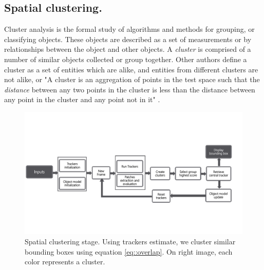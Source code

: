 
\subsection{Spatial clustering.}

Cluster analysis is the formal study of algorithms and methods for grouping, or
classifying objects. These objects are described as a set of measurements or by
relationships between the object and other objects. A \textit{cluster} is
comprised of a number of similar objects collected or group together. Other
authors define a cluster as a set of entities which are alike, and entities from
different clusters are not alike, or "A cluster is an aggregation of points in
the test space such that the \textit{distance} between any two points in the
cluster is less than the distance between any point in the cluster and any point
not in it" \cite{Jain88}.

\begin{figure}[b!]
\centering
\includegraphics[page=4, width=0.9\linewidth, trim= 0.4cm 5.5cm 6.5cm 5cm,
                 clip=true]{Figures/global_diagram}
\caption[Spatial clustering stage]{\small Spatial clustering stage. Using
        trackers estimate, we cluster similar bounding boxes using equation
        \ref{eq::overlap}. On right image, each color represents a cluster.}
\label{fig::clustering}
\end{figure}


